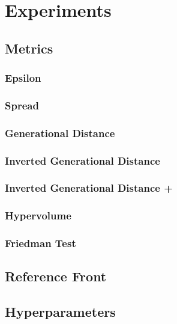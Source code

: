 \chapter{Experiments}
\label{chapter:chapter05}

\section{Metrics}

\subsection{Epsilon}
\subsection{Spread}
\subsection{Generational Distance}
\subsection{Inverted Generational Distance}
\subsection{Inverted Generational Distance +}
\subsection{Hypervolume}
\subsection{Friedman Test}

\section{Reference Front}

\section{Hyperparameters}

